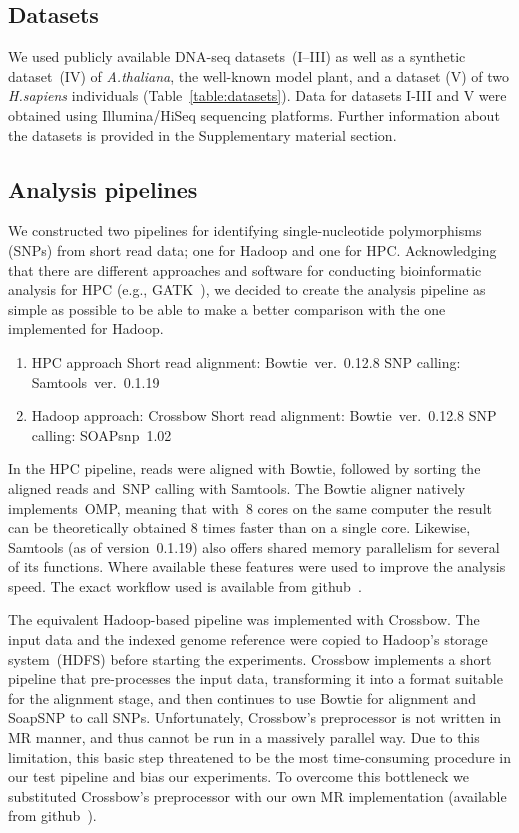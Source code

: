 \documentclass[10pt]{article}
\begin{document}
\subsection*{Datasets}
We used publicly available DNA-seq datasets~(I--III) as well as a synthetic dataset~(IV) of {\it A.thaliana}, the well-known model plant, and a dataset (V) of two {\it H.sapiens} individuals (Table~\ref{table:datasets}). Data for datasets I-III and V were obtained using Illumina/HiSeq sequencing platforms. Further information about the datasets is provided in the Supplementary material section.


\subsection*{Analysis pipelines}
We constructed two pipelines for identifying single-nucleotide polymorphisms (SNPs) from short read data; one for Hadoop and one for HPC.
Acknowledging that there are different approaches and software for conducting bioinformatic analysis for HPC (e.g., GATK~\cite{gatk}), we decided to create the analysis pipeline as simple as possible to be able to make a better comparison with the one implemented for Hadoop.

\begin{enumerate}
\item HPC approach
\subitem Short read alignment: Bowtie~ver.~0.12.8
\subitem SNP calling: Samtools~ver.~0.1.19
\item Hadoop approach: Crossbow
\subitem Short read alignment: Bowtie~ver.~0.12.8
\subitem SNP calling: SOAPsnp~1.02~\cite{soapsnp}
\end{enumerate}


In the HPC pipeline, reads were aligned with Bowtie, followed by sorting the aligned reads and~SNP calling with Samtools. The Bowtie aligner natively implements~OMP, meaning that with~8 cores on the same computer the result can be theoretically obtained 8 times faster than on a single core. Likewise, Samtools (as of version~0.1.19) also offers shared memory parallelism for several of its functions. Where available these features were used to improve the analysis speed. The exact workflow used is available from github~\cite{code_repo_bash}.

The equivalent Hadoop-based pipeline was implemented with Crossbow. The input data and the indexed genome reference were copied to Hadoop's storage system~(HDFS) before starting the experiments. Crossbow implements a short pipeline that pre-processes the input data, transforming it into a format suitable for the alignment stage, and then continues to use Bowtie for alignment and SoapSNP to call SNPs.  Unfortunately, Crossbow's preprocessor is not written in MR manner, and thus cannot be run in a massively parallel way. Due to this limitation, this basic step threatened to be the most time-consuming procedure in our test pipeline and bias our experiments. To overcome this bottleneck we substituted Crossbow's preprocessor with our own MR implementation (available from github~\cite{code_repo_mr}).
\end{document}
